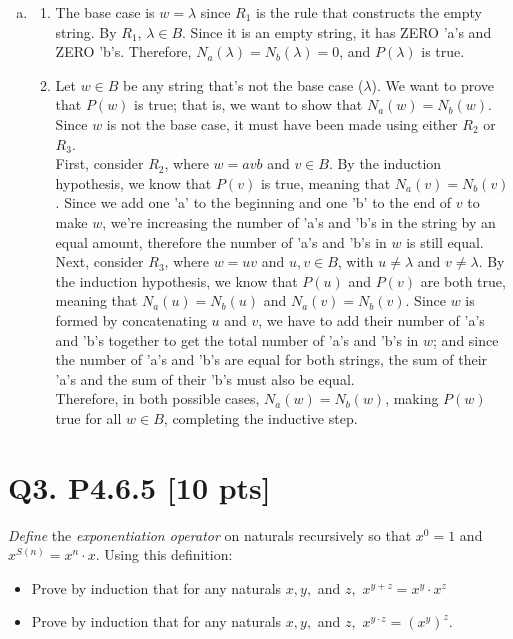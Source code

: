 \documentclass[12pt]{article}
\begin{document}
\begin{enumerate}[(a)]
		\item
			\begin{enumerate}
				\item[(ii)] The base case is $w=\lambda$ since $R_{1}$ is the rule that constructs
					the empty string. By $R_{1}$, $\lambda \in B$. Since it is an empty
					string, it has ZERO 'a's and ZERO 'b's. Therefore, $N_{a}(\lambda)=N_{b}
					(\lambda)=0$, and $P(\lambda)$ is true.

				\item[(iii)] Let $w \in B$ be any string that's not the base case ($\lambda$).
					We want to prove that $P(w)$ is true; that is, we want to show that
					$N_{a}(w)=N_{b}(w)$. Since $w$ is not the base case, it must have been
					made using either $R_{2}$ or $R_{3}$. \\
					First, consider $R_{2}$, where $w=avb$ and $v \in B$. By the induction
					hypothesis, we know that $P(v)$ is true, meaning that
					$N_{a}(v)=N_{b}(v)$. Since we add one 'a' to the beginning and one 'b'
					to the end of $v$ to make $w$, we're increasing the number of 'a's and
					'b's in the string by an equal amount, therefore the number of 'a's
					and 'b's in $w$ is still equal. \\
					Next, consider $R_{3}$, where $w=uv$ and $u,v \in B$, with $u\neq\lambda$
					and $v\neq\lambda$. By the induction hypothesis, we know that $P(u)$ and
					$P(v)$ are both true, meaning that $N_{a}(u)=N_{b}(u)$ and
					$N_{a}(v)=N_{b}(v)$. Since $w$ is formed by concatenating $u$ and $v$,
					we have to add their number of 'a's and 'b's together to get the total
					number of 'a's and 'b's in $w$; and since the number of 'a's and 'b's are
					equal for both strings, the sum of their 'a's and the sum of their 'b's
					must also be equal. \\
					Therefore, in both possible cases, $N_{a}(w)=N_{b}(w)$, making $P(w)$
					true for all $w \in B$, completing the inductive step.
			\end{enumerate}
	\end{enumerate}

	\newpage
	\section*{\textbf{Q3. P4.6.5} [10 pts]}
	{\em Define} the {\em exponentiation operator} on naturals recursively so that
	$x^{0} = 1$ and $x^{S(n)}= x^{n} \cdot x$. Using this definition:

	\begin{itemize}
		\item[(a)] Prove by induction %
			that for any naturals $x, y,$ and $z,$ $x^{y+z}= x^{y} \cdot x^{z}$

		\item[(b)] Prove by induction %
			that for any naturals $x, y,$ and $z,$ $x^{y \cdot z}= (x^{y})^{z}.$
	\end{itemize}
\end{document}
